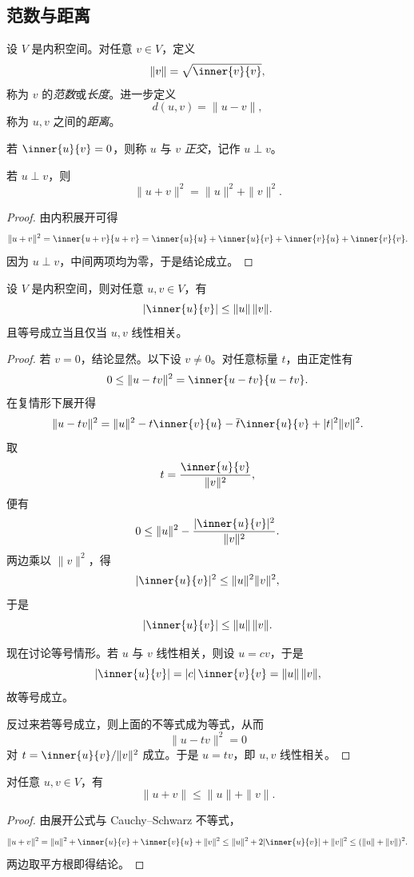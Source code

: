 \subsection{范数与距离}

\begin{definition}
设 $V$ 是内积空间。对任意 $v\in V$，定义
\[
\|v\|=\sqrt{\inner{v}{v}},
\]
称为 $v$ 的\emph{范数}或\emph{长度}。进一步定义
\[
 d(u,v)=\|u-v\|,
\]
称为 $u,v$ 之间的\emph{距离}。

若 $\inner{u}{v}=0$，则称 $u$ 与 $v$ \emph{正交}，记作 $u\perp v$。
\end{definition}

\begin{proposition}[勾股恒等式]
若 $u\perp v$，则
\[
\|u+v\|^2=\|u\|^2+\|v\|^2.
\]
\end{proposition}

\begin{proof}
由内积展开可得
\[
\|u+v\|^2=\inner{u+v}{u+v}=\inner{u}{u}+\inner{u}{v}+\inner{v}{u}+\inner{v}{v}.
\]
因为 $u\perp v$，中间两项均为零，于是结论成立。
\end{proof}

\begin{theorem}
设 $V$ 是内积空间，则对任意 $u,v\in V$，有
\[
|\inner{u}{v}|\le \|u\|\,\|v\|.
\]
且等号成立当且仅当 $u,v$ 线性相关。
\end{theorem}

\begin{proof}
若 $v=0$，结论显然。以下设 $v\ne 0$。对任意标量 $t$，由正定性有
\[
0\le \|u-tv\|^2=\inner{u-tv}{u-tv}.
\]
在复情形下展开得
\[
\|u-tv\|^2=\|u\|^2-t\inner{v}{u}-\overline{t}\inner{u}{v}+|t|^2\|v\|^2.
\]
取
\[
t=\frac{\inner{u}{v}}{\|v\|^2},
\]
便有
\[
0\le \|u\|^2-\frac{|\inner{u}{v}|^2}{\|v\|^2}.
\]
两边乘以 $\|v\|^2$，得
\[
|\inner{u}{v}|^2\le \|u\|^2\|v\|^2,
\]
于是
\[
|\inner{u}{v}|\le \|u\|\,\|v\|.
\]

现在讨论等号情形。若 $u$ 与 $v$ 线性相关，则设 $u=cv$，于是
\[
|\inner{u}{v}|=|c|\,\inner{v}{v}=\|u\|\,\|v\|,
\]
故等号成立。

反过来若等号成立，则上面的不等式成为等式，从而
\[
\|u-tv\|^2=0
\]
对 $t=\inner{u}{v}/\|v\|^2$ 成立。于是 $u=tv$，即 $u,v$ 线性相关。
\end{proof}

\begin{corollary}[三角不等式]
对任意 $u,v\in V$，有
\[
\|u+v\|\le \|u\|+\|v\|.
\]
\end{corollary}

\begin{proof}
由展开公式与 Cauchy--Schwarz 不等式，
\[
\|u+v\|^2=\|u\|^2+\inner{u}{v}+\inner{v}{u}+\|v\|^2
\le \|u\|^2+2|\inner{u}{v}|+\|v\|^2
\le (\|u\|+\|v\|)^2.
\]
两边取平方根即得结论。
\end{proof}


